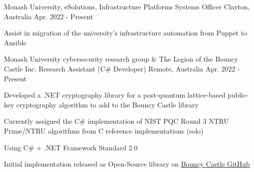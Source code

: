 

\begin{cventries}

  \cventry
  {Monash University, eSolutions, Infrastructure Platforms} %
  {Systems Officer} %
  {Clayton, Australia} %
  {Apr. 2022 - Present} %
  {
    \begin{cvitems} %
      \item {Assist in migration of the university's infrastructure automation from Puppet to Ansible}
    \end{cvitems}
  }

  \cventry
    {Monash University cybersecurity research group \& The Legion of the Bouncy Castle Inc.} %
    {Research Assistant (C\# Developer)} %
    {Remote, Australia} %
    {Apr. 2022 - Present} %
    {
      \begin{cvitems} %
        \item {Developed a .NET cryptography library for a post-quantum lattice-based public-key cryptography algorithm to add to the Bouncy Castle library}
        \item {Currently assigned the C\# implementation of NIST PQC Round 3 NTRU Prime/NTRU algorithms from C reference implementations (solo)}
        \item {Using C\# + .NET Framework Standard 2.0}
        \item {Initial implementation released as Open-Source library on \href{https://github.com/bcgit/bc-csharp}{Bouncy Castle GitHub}}
      \end{cvitems}
    }


\end{cventries}
\vspace{-3.0mm}